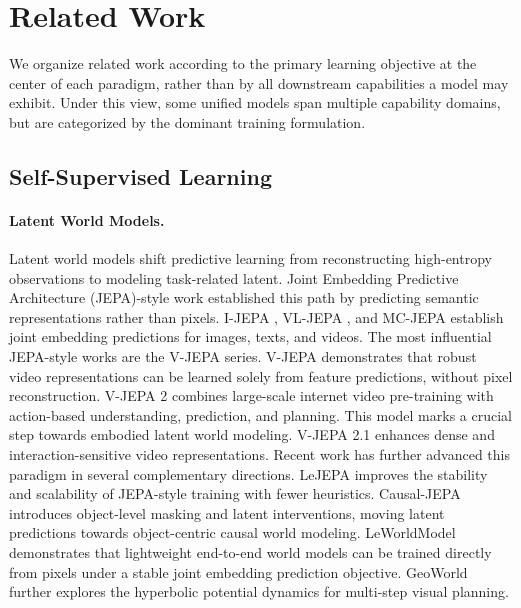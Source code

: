 \section{Related Work}\label{sec:appendix_related_work}

\renewcommand{\thefigure}{B\arabic{figure}}
\renewcommand{\theHfigure}{B\arabic{figure}}
\setcounter{figure}{0}

\renewcommand{\thetable}{B\arabic{table}}
\renewcommand{\theHtable}{B\arabic{table}}
\setcounter{table}{0}



We organize related work according to the primary learning objective at the center of each paradigm, rather than by all downstream capabilities a model may exhibit. Under this view, some unified models span multiple capability domains, but are categorized by the dominant training formulation.


\vspace{-1em}
\subsection{Self-Supervised Learning}\label{sec:ssl}

\paragraph{Latent World Models.}\label{sec:jepas}
Latent world models shift predictive learning from reconstructing high-entropy observations to modeling task-related latent. Joint Embedding Predictive Architecture (JEPA)-style work established this path by predicting semantic representations rather than pixels. I-JEPA \citep{I-JEPA}, VL-JEPA \citep{VL-JEPA}, and MC-JEPA \citep{MC-JEPA} establish joint embedding predictions for images, texts, and videos. The most influential JEPA-style works are the V-JEPA series. V-JEPA \citep{V-JEPA} demonstrates that robust video representations can be learned solely from feature predictions, without pixel reconstruction. V-JEPA 2 \citep{V-JEPA-2} combines large-scale internet video pre-training with action-based understanding, prediction, and planning. This model marks a crucial step towards embodied latent world modeling. V-JEPA 2.1 \citep{V-JEPA-2.1} enhances dense and interaction-sensitive video representations. Recent work has further advanced this paradigm in several complementary directions. LeJEPA \citep{LeJEPA} improves the stability and scalability of JEPA-style training with fewer heuristics. Causal-JEPA \citep{Causal-JEPA} introduces object-level masking and latent interventions, moving latent predictions towards object-centric causal world modeling. LeWorldModel \citep{LeWorldModel} demonstrates that lightweight end-to-end world models can be trained directly from pixels under a stable joint embedding prediction objective. GeoWorld \citep{GeoWorld} further explores the hyperbolic potential dynamics for multi-step visual planning.

